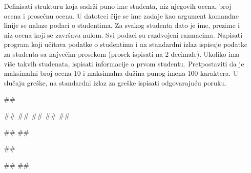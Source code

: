 \begin{Exercise}[label=p3_x3]         
Definisati strukturu  koja sadrži puno ime studenta, niz njegovih ocena, broj ocena i 
prosečnu ocenu.
U datoteci čije se ime zadaje kao argument komandne linije se nalaze podaci o studentima. 
Za svakog studenta dato je ime, prezime i niz ocena koji se završava nulom. 
Svi podaci su razdvojeni razmacima. Napisati program koji učitava podatke o studentima i
na standardni izlaz ispisuje podatke za studenta sa najvećim prosekom (prosek ispisati na $2$ decimale).
Ukoliko ima više takvih studenata, ispisati informacije o prvom studentu.
Pretpostaviti da je maksimalni broj ocena $10$ i maksimalna dužina punog imena $100$ karaktera. 
U slučaju greške, na standardni izlaz za greške ispisati odgovarajuću poruku.


\begin{miditest}
\begin{upotreba}{1}
##

##
##
##
##
##

#\naslovIzlaz#
##
\end{upotreba}
\end{miditest}
\begin{miditest}
\begin{upotreba}{2}
##

#\naslovIzlazZaGresku#
##
\end{upotreba}
\end{miditest}
\end{Exercise}
\begin{Answer}[ref=p3_x3]
\end{Answer}


